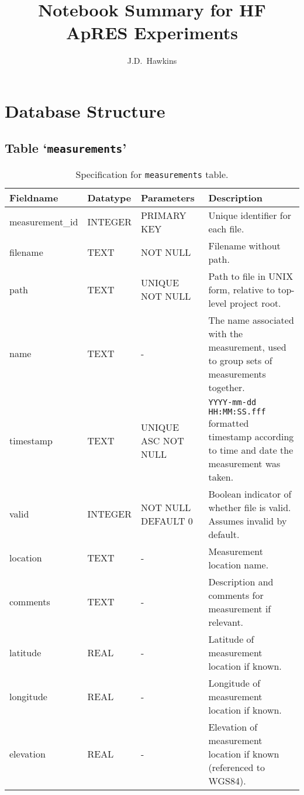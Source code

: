 \documentclass[a4paper]{article}
\title{\textbf{Notebook Summary for HF ApRES Experiments}}
\author{J.D.~Hawkins}
\newcommand{\sqlspectable}[2]{
    \renewcommand{\arraystretch}{1.5}
    \rowcolors{2}{gray!10}{white}
    \begin{longtable}{l l >{\raggedright}p{3cm} >{\raggedright\arraybackslash}p{4cm}}
        \caption{#2} \\
        \hline
        \textbf{Fieldname} & \textbf{Datatype} & \textbf{Parameters} & \textbf{Description}\\
        \hline
        \endhead
        \hline
        \endfoot
        #1
    \end{longtable}
}
\begin{document}
    \maketitle
    
    \newpage

    \tableofcontents

    \newpage

    \section{Database Structure}

    \subsection{Table `\texttt{measurements}'}
    \sqlspectable{
        measurement\_id & INTEGER & PRIMARY KEY & 
        Unique identifier for each file. \\
        filename & TEXT & NOT NULL & 
        Filename without path. \\
        path & TEXT & UNIQUE NOT NULL&
        Path to file in UNIX form, relative to top-level project root. \\
        name & TEXT & - &
        The name associated with the measurement, used to group sets of 
        measurements together. \\
        timestamp & TEXT & UNIQUE ASC NOT NULL &
        \texttt{YYYY-mm-dd HH:MM:SS.fff} formatted timestamp according to
        time and date the measurement was taken. \\
        valid & INTEGER & NOT NULL DEFAULT 0 &
        Boolean indicator of whether file is valid. Assumes invalid by 
        default. \\
        location & TEXT & - & 
        Measurement location name. \\
        comments & TEXT & - &
        Description and comments for measurement if relevant. \\
        latitude & REAL & - &
        Latitude of measurement location if known. \\
        longitude & REAL & - & 
        Longitude of measurement location if known. \\
        elevation & REAL & - & 
        Elevation of measurement location if known (referenced to WGS84). \\
    }
    {Specification for \texttt{measurements} table.}
    
\end{document}
